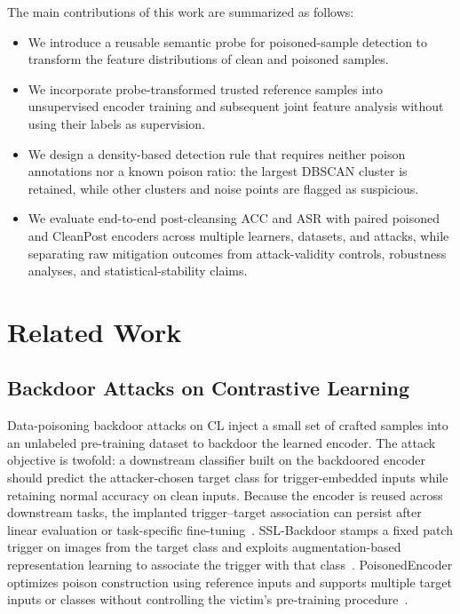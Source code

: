 \documentclass[10pt,journal]{IEEEtran}
\begin{document}
The main contributions of this work are summarized as follows:
\begin{itemize}
    \item We introduce a reusable semantic probe for poisoned-sample detection to transform the feature distributions of clean and poisoned samples.
    \item We incorporate probe-transformed trusted reference samples into unsupervised encoder training and subsequent joint feature analysis without using their labels as supervision.
    \item We design a density-based detection rule that requires neither poison annotations nor a known poison ratio: the largest DBSCAN cluster is retained, while other clusters and noise points are flagged as suspicious.
    \item We evaluate end-to-end post-cleansing ACC and ASR with paired poisoned and CleanPost encoders across multiple learners, datasets, and attacks, while separating raw mitigation outcomes from attack-validity controls, robustness analyses, and statistical-stability claims.
\end{itemize}

\section{Related Work}\label{sec:relatedwork}
\subsection{Backdoor Attacks on Contrastive Learning}
Data-poisoning backdoor attacks on CL inject a small set of crafted samples into an unlabeled pre-training dataset to backdoor the learned encoder. The attack objective is twofold: a downstream classifier built on the backdoored encoder should predict the attacker-chosen target class for trigger-embedded inputs while retaining normal accuracy on clean inputs. Because the encoder is reused across downstream tasks, the implanted trigger--target association can persist after linear evaluation or task-specific fine-tuning~\cite{Carlini2022Poisoning}. SSL-Backdoor stamps a fixed patch trigger on images from the target class and exploits augmentation-based representation learning to associate the trigger with that class~\cite{Saha2022SSLBackdoor}. PoisonedEncoder optimizes poison construction using reference inputs and supports multiple target inputs or classes without controlling the victim's pre-training procedure~\cite{Liu2022PoisonedEncoder}.
\end{document}

